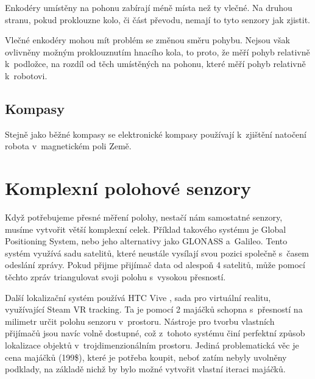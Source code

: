 Enkodéry umístěny na pohonu zabírají méně místa než ty vlečné. 
Na druhou stranu, pokud proklouzne kolo, či část převodu, nemají to tyto senzory jak zjistit.

Vlečné enkodéry mohou mít problém se změnou směru pohybu.
Nejsou však ovlivněny možným proklouznutím hnacího kola, to proto, že měří pohyb relativně k~podložce, na rozdíl od těch umístěných na pohonu, které měří pohyb relativně k~robotovi.


\subsection{Kompasy}
Stejně jako běžné kompasy se elektronické kompasy používají k~zjištění natočení robota v~magnetickém poli Země.

\section{Komplexní polohové senzory}
Když potřebujeme přesné měření polohy, nestačí nám samostatné senzory, musíme vytvořit větší komplexní celek.
Příklad takového systému je Global Positioning System, nebo jeho alternativy jako GLONASS a~Galileo.
Tento systém využívá sadu satelitů, které neustále vysílají svou pozici společně s~časem odeslání zprávy.
Pokud přijme přijímač data od alespoň 4 satelitů, může pomocí těchto zpráv triangulovat svoji polohu s~vysokou přesností.

Další lokalizační systém používá HTC Vive \cite{htc}, sada pro virtuální realitu, využívající Steam VR \cite{steam} tracking.
Ta je pomocí 2 majáčků schopna s~přesností na milimetr určit polohu senzoru v~prostoru.
Nástroje pro tvorbu vlastních přijímačů jsou navíc volně dostupné, což z~tohoto systému činí perfektní způsob lokalizace objektů v~trojdimenzionálním prostoru.
Jediná problematická věc je cena majáčků (199\$), které je potřeba koupit, neboť zatím nebyly uvolněny podklady, na základě nichž by bylo možné vytvořit vlastní iteraci majáčků.


